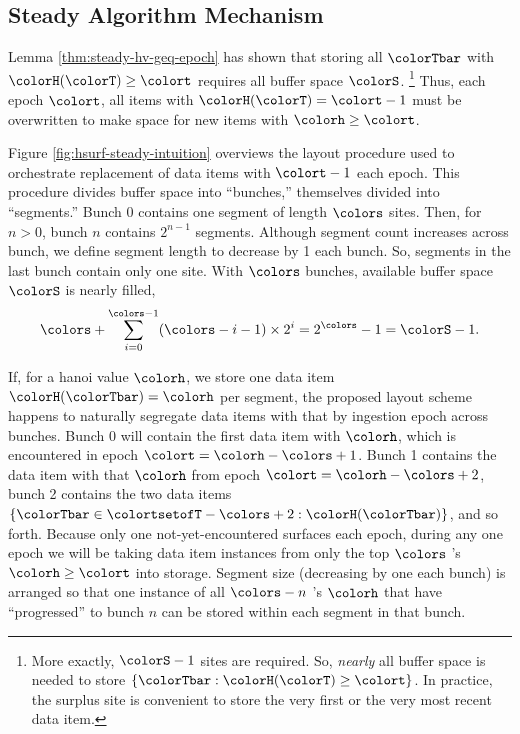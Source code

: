

\subsection{Steady Algorithm Mechanism}
\label{sec:steady-mechanism}



Lemma \ref{thm:steady-hv-geq-epoch} has shown that storing all $\colorTbar$ with $\colorH(\colorT) \geq \colort$ requires all buffer space $\colorS$.%
\footnote{%
More exactly, $\colorS - 1$ sites are required.
So, \textit{nearly} all buffer space is needed to store $\{\colorTbar : \colorH(\colorT) \geq \colort\}$.
In practice, the surplus site is convenient to store the very first or the very most recent data item.
}
Thus, each epoch $\colort$, all items with $\colorH(\colorT) = \colort - 1$ must be overwritten to make space for new items with \hv{} $\colorh \geq \colort$.

Figure \ref{fig:hsurf-steady-intuition} overviews the layout procedure used to orchestrate replacement of data items with \hv{} $\colort - 1$ each epoch.
This procedure divides buffer space into ``bunches,'' themselves divided into ``segments.''
Bunch 0 contains one segment of length $\colors$ sites.
Then, for $n > 0$, bunch $n$ contains $2^{n-1}$ segments.
Although segment count increases across bunch, we define segment length to decrease by 1 each bunch.
So, segments in the last bunch contain only one site.
With $\colors$ bunches, available buffer space $\colorS$ is nearly filled,
\begin{align*}
\colors + \sum_{i=0}^{\colors-1} (\colors - i - 1) \times 2^{i} = 2^{\colors} - 1 = \colorS - 1.
\end{align*}

If, for a hanoi value $\colorh$, we store one data item $\colorH(\colorTbar) = \colorh$ per segment, the proposed layout scheme happens to naturally segregate data items with that \hv{} by ingestion epoch across bunches.
Bunch 0 will contain the first data item with \hv{} $\colorh$, which is encountered in epoch $\colort=\colorh - \colors + 1$.
Bunch 1 contains the data item with that \hv{} $\colorh$ from epoch $\colort=\colorh - \colors + 2$, bunch 2 contains the two data items $\{ \colorTbar \in \colortsetofT - \colors + 2 : \colorH(\colorTbar) \}$, and so forth.
Because only one not-yet-encountered \hv{} surfaces each epoch, during any one epoch we will be taking data item instances from only the top $\colors$ \hv{}'s $\colorh \geq \colort$ into storage.
Segment size (decreasing by one each bunch) is arranged so that one instance of all $\colors - n$ \hv{}'s $\colorh$ that have ``progressed'' to bunch $n$ can be stored within each segment in that bunch.

